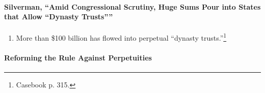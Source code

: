 \paragraph{Silverman, ``Amid Congressional Scrutiny, Huge Sums Pour into 
States that Allow \enquote{Dynasty Trusts}''}

\begin{enumerate}
    \item More than \$100 billion has flowed into perpetual ``dynasty 
    trusts.''\footnote{Casebook p. 315.}
\end{enumerate}

\paragraph{Reforming the Rule Against Perpetuities}

